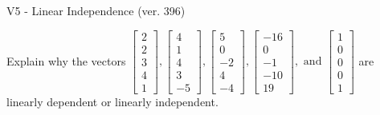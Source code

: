 \begin{exercise}
  \begin{exerciseTitle}V5 - Linear Independence (ver. 396)\end{exerciseTitle}
  \begin{exerciseStatement}
    Explain why the vectors \(\left[\begin{array}{r}
2 \\
2 \\
3 \\
4 \\
1
\end{array}\right] , \left[\begin{array}{r}
4 \\
1 \\
4 \\
3 \\
-5
\end{array}\right] , \left[\begin{array}{r}
5 \\
0 \\
-2 \\
4 \\
-4
\end{array}\right] , \left[\begin{array}{r}
-16 \\
0 \\
-1 \\
-10 \\
19
\end{array}\right] , \text{ and } \left[\begin{array}{r}
1 \\
0 \\
0 \\
0 \\
1
\end{array}\right]\) are linearly dependent or linearly independent.	



\end{exerciseStatement}
\end{exercise}
